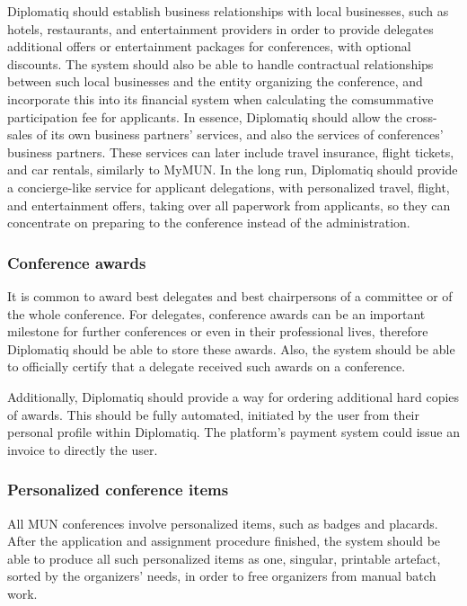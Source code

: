 Diplomatiq should establish business relationships with local businesses, such as hotels, restaurants, and entertainment providers in order to provide delegates additional offers or entertainment packages for conferences, with optional discounts. The system should also be able to handle contractual relationships between such local businesses and the entity organizing the conference, and incorporate this into its financial system when calculating the comsummative participation fee for applicants. In essence, Diplomatiq should allow the cross-sales of its own business partners' services, and also the services of conferences' business partners. These services can later include travel insurance, flight tickets, and car rentals, similarly to MyMUN. In the long run, Diplomatiq should provide a concierge-like service for applicant delegations, with personalized travel, flight, and entertainment offers, taking over all paperwork from applicants, so they can concentrate on preparing to the conference instead of the administration.

\subsubsection{Conference awards}

It is common to award best delegates and best chairpersons of a committee or of the whole conference. For delegates, conference awards can be an important milestone for further conferences or even in their professional lives, therefore Diplomatiq should be able to store these awards. Also, the system should be able to officially certify that a delegate received such awards on a conference.

Additionally, Diplomatiq should provide a way for ordering additional hard copies of awards. This should be fully automated, initiated by the user from their personal profile within Diplomatiq. The platform's payment system could issue an invoice to directly the user.

\subsubsection{Personalized conference items}

All MUN conferences involve personalized items, such as badges and placards. After the application and assignment procedure finished, the system should be able to produce all such personalized items as one, singular, printable artefact, sorted by the organizers' needs, in order to free organizers from manual batch work.

